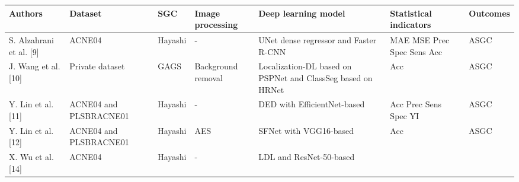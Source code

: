 \documentclass[16pt]{extarticle}
\newcounter{none} %
\begin{document}
{\def\LTcaptype{none} %
\begin{longtable}[]{@{}
  >{\raggedright\arraybackslash}p{}
  >{\raggedright\arraybackslash}p{}
  >{\raggedright\arraybackslash}p{}
  >{\raggedright\arraybackslash}p{}
  >{\raggedright\arraybackslash}p{}
  >{\raggedright\arraybackslash}p{}
  >{\raggedright\arraybackslash}p{}@{}}
\toprule\noalign{}
\begin{minipage}[b]{\linewidth}\centering
\textbf{Authors}
\end{minipage} & \begin{minipage}[b]{\linewidth}\centering
\textbf{Dataset}
\end{minipage} & \begin{minipage}[b]{\linewidth}\centering
\textbf{SGC}
\end{minipage} & \begin{minipage}[b]{\linewidth}\centering
\textbf{Image processing}
\end{minipage} & \begin{minipage}[b]{\linewidth}\centering
\textbf{Deep learning model}
\end{minipage} & \begin{minipage}[b]{\linewidth}\centering
\textbf{Statistical indicators}
\end{minipage} & \begin{minipage}[b]{\linewidth}\centering
\textbf{Outcomes}
\end{minipage} \\
\midrule\noalign{}
\endhead
\bottomrule\noalign{}
\endlastfoot
S. Alzahrani et al. {[}9{]} & ACNE04 & Hayashi & - & UNet dense
regressor and Faster R-CNN & MAE MSE Prec Spec Sens Acc & ASGC \\
J. Wang et al. {[}10{]} & Private dataset & GAGS & Background removal &
Localization-DL based on PSPNet and ClassSeg based on HRNet & Acc &
ASGC \\
Y. Lin et al. {[}11{]} & ACNE04 and PLSBRACNE01 & Hayashi & - & DED with
EfficientNet-based & Acc Prec Sens Spec YI & ASGC \\
Y. Lin et al. {[}12{]} & ACNE04 and PLSBRACNE01 & Hayashi & AES & SFNet
with VGG16-based & Acc & ASGC \\
X. Wu et al. {[}14{]} & ACNE04 & Hayashi & - & LDL and ResNet-50-based &

\end{longtable}}
\end{document}
